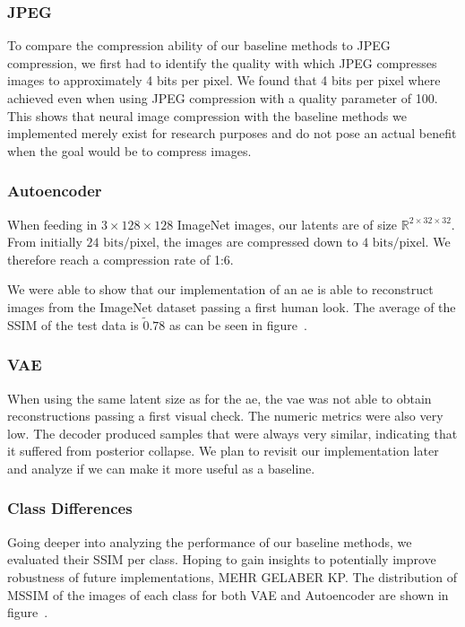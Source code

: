 \subsubsection{JPEG}\label{subsubsec:autoencoder}
To compare the compression ability of our baseline methods to JPEG compression, we first had to identify the quality with which JPEG compresses images to approximately 4 bits per pixel.
We found that 4 bits per pixel where achieved even when using JPEG compression with a quality parameter of 100.
This shows that neural image compression with the baseline methods we implemented merely exist for research purposes and do not pose an actual benefit when the goal would be to compress images.


\subsubsection{Autoencoder}\label{subsubsec:autoencoder}
When feeding in $3 \times 128 \times 128$ ImageNet images, our latents are of size $\mathbb{R}^{2\times 32 \times 32}$.
From initially $24\text{ bits/pixel}$, the images are compressed down to $4\text{ bits/pixel}$.
We therefore reach a compression rate of 1:6.

We were able to show that our implementation of an \ac{ae} is able to reconstruct images from the ImageNet dataset
passing a first human look.
The average of the SSIM of the test data is $\tilde0.78$ as can be seen in figure~\cite{citationNeeded}.

\subsubsection{VAE}\label{subsubsec:vae_training}
When using the same latent size as for the \ac{ae}, the \ac{vae} was not able to obtain reconstructions
passing a first visual check.
The numeric metrics were also very low.
The decoder produced samples that were always very similar, indicating that it suffered from posterior collapse.
We plan to revisit our implementation later and analyze if we can make it more useful as a baseline.

\subsubsection{Class Differences}\label{subsubsec:class-differences}
Going deeper into analyzing the performance of our baseline methods, we evaluated their SSIM per class.
Hoping to gain insights to potentially improve robustness of future implementations, MEHR GELABER KP.
The distribution of MSSIM of the images of each class for both VAE and Autoencoder are shown in figure~\cite{citationNeeded}.

